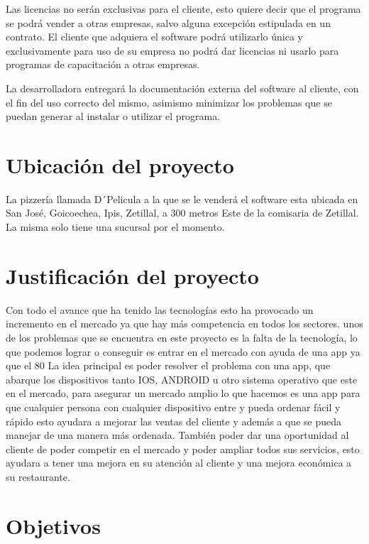 \documentclass[conference]{IEEEtran}
\begin{document}
Las licencias no serán exclusivas para el cliente, esto quiere decir que el programa se podrá vender a otras empresas, salvo alguna excepción estipulada en un contrato. El cliente que adquiera el software podrá utilizarlo única y exclusivamente para uso de su empresa no podrá dar licencias ni usarlo para programas de capacitación a otras empresas.

La desarrolladora entregará la documentación externa del software al cliente, con el fin del uso correcto del mismo, asimismo minimizar los problemas que se puedan generar al instalar o utilizar el programa.

\section{Ubicación del proyecto}

La pizzería llamada D´Pelicula a la que se le venderá el software esta ubicada en San José, Goicoechea, Ipis, Zetillal, a 300 metros Este de la comisaria de Zetillal.
La misma solo tiene una sucursal por el momento.

\section{Justificación del proyecto}

Con todo el avance que ha tenido las tecnologías esto ha provocado un incremento en el mercado ya que hay más competencia en todos los sectores. unos de los problemas que se encuentra en este proyecto es la falta de la tecnología, lo que podemos lograr o conseguir es entrar en el mercado con ayuda de una app ya que el 80 %
La idea principal es poder resolver el problema con una app, que abarque los dispositivos tanto IOS, ANDROID u otro sistema operativo que este en el mercado, para asegurar un mercado amplio lo que hacemos es una app para que cualquier persona con cualquier dispositivo entre y pueda ordenar fácil y rápido esto ayudara a mejorar las ventas del cliente y además a que se pueda manejar de una manera más ordenada. También poder dar una oportunidad al cliente de poder competir en el mercado y poder ampliar todos sus servicios, esto ayudara a tener una mejora en su atención al cliente y una mejora económica a su restaurante. 

\section{Objetivos}
\end{document}
